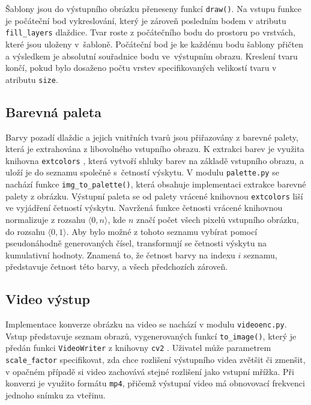 Šablony jsou do výstupního obrázku přeneseny funkcí \verb|draw()|. Na vstupu funkce je počáteční bod vykreslování, který je zároveň posledním bodem v atributu \verb|fill_layers| dlaždice. Tvar roste z počátečního bodu do prostoru po vrstvách, které jsou uloženy v~šabloně. Počáteční bod je ke každému bodu šablony přičten a výsledkem je absolutní souřadnice bodu ve~výstupním obrazu. Kreslení tvaru končí, pokud bylo dosaženo počtu vrstev specifikovaných velikostí tvaru v atributu \verb|size|.

\subsection*{Barevná paleta}

Barvy pozadí dlaždic a jejich vnitřních tvarů jsou přiřazovány z barevné palety, která je extrahována z libovolného vstupního obrazu. K extrakci barev je využita knihovna \verb|extcolors| \cite{extcolors}, která vytvoří shluky barev na základě vstupního obrazu, a uloží je do seznamu společně s~četností výskytu. V modulu \verb|palette.py| se nachází funkce \verb|img_to_palette()|, která obsahuje implementaci extrakce barevné palety z obrázku. Výstupní paleta se od palety vrácené knihovnou \verb|extcolors| liší ve vyjádření četností výskytu. Navržená funkce četnosti vrácené knihovnou normalizuje z rozsahu $\langle 0, n \rangle$, kde $n$ značí počet všech pixelů vstupního obrázku, do rozsahu $\langle 0, 1 \rangle$. Aby bylo možné z tohoto seznamu vybírat pomocí pseudonáhodně generovaných čísel, transformují se četnosti výskytu na kumulativní hodnoty. Znamená to, že četnost barvy na indexu $i$ seznamu, představuje četnost této barvy, a všech předchozích zároveň.  

\subsection*{Video výstup}

Implementace konverze obrázku na video se nachází v modulu \verb|videoenc.py|. Vstup představuje seznam obrazů, vygenerovaných funkcí \verb|to_image()|, který je předán funkci \linebreak \verb|VideoWriter| z knihovny \verb|cv2| \cite{cv2}. Uživatel může parametrem \verb|scale_factor| specifikovat, zda chce rozlišení výstupního videa zvětšit či zmenšit, v opačném případě si video zachovává stejné rozlišení jako vstupní mřížka. Při konverzi je využito formátu \verb|mp4|, přičemž výstupní video má obnovovací frekvenci jednoho snímku za vteřinu.

